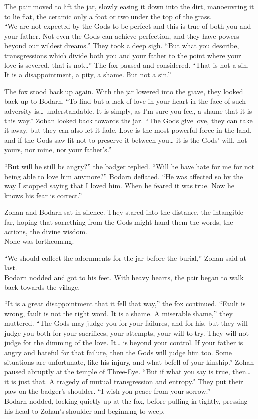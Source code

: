 The pair moved to lift the jar, slowly easing it down into the dirt, manoeuvring it to lie flat, the ceramic only a foot or two under the top of the grass.\\
``We are not expected by the Gods to be perfect and this is true of both you and your father. Not even the Gods can achieve perfection, and they have powers beyond our wildest dreams.'' They took a deep sigh. ``But what you describe, transgressions which divide both you and your father to the point where your love is severed, that is not\ldots'' The fox paused and considered. ``That is not a sin. It is a disappointment, a pity, a shame. But not a sin.''

The fox stood back up again. With the jar lowered into the grave, they looked back up to Bodarn. ``To find but a lack of love in your heart in the face of such adversity is\ldots{} understandable. It is simply, as I'm sure you feel, a shame that it is this way.'' Zohan looked back towards the jar. ``The Gods give love, they can take it away, but they can also let it fade. Love is the most powerful force in the land, and if the Gods saw fit not to preserve it between you\ldots{} it is the Gods' will, not yours, nor mine, nor your father's.''

``But will he still be angry?'' the badger replied. ``Will he have hate for me for not being able to love him anymore?'' Bodarn deflated. ``He was affected so by the way I stopped saying that I loved him. When he feared it was true. Now he knows his fear is correct.''

Zohan and Bodarn sat in silence. They stared into the distance, the intangible far, hoping that something from the Gods might hand them the words, the actions, the divine wisdom.\\
None was forthcoming.

``We should collect the adornments for the jar before the burial,'' Zohan said at last.\\
Bodarn nodded and got to his feet. With heavy hearts, the pair began to walk back towards the village.

``It is a great disappointment that it fell that way,'' the fox continued. ``Fault is wrong, fault is not the right word. It is a shame. A miserable shame,'' they muttered. ``The Gods may judge you for your failures, and for his, but they will judge you both for your sacrifices, your attempts, your will to try. They will not judge for the dimming of the love. It\ldots{} is beyond your control. If your father is angry and hateful for that failure, then the Gods will judge him too. Some situations are unfortunate, like his injury, and what befell of your kinship.'' Zohan paused abruptly at the temple of Three-Eye. ``But if what you say is true, then\ldots{} it is just that. A tragedy of mutual transgression and entropy.'' They put their paw on the badger's shoulder. ``I wish you peace from your sorrow.''\\
Bodarn nodded, looking quietly up at the fox, before pulling in tightly, pressing his head to Zohan's shoulder and beginning to weep.

